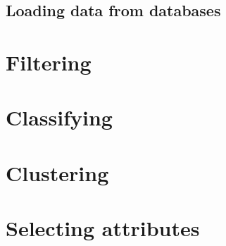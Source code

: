 \subsection{Loading data from databases}

\section{Filtering}

\section{Classifying}

\section{Clustering}

\section{Selecting attributes}


